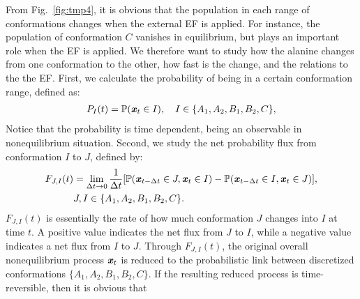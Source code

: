 \documentclass[a4paper,preprint,unsortedaddress,onecolumn]{revtex4-1}
\newcommand{\vect}[1]{\textbf{\textit{#1}}}
\newcommand{\fwd}[0]{\textrm{fwd}}
\newcommand{\bwd}[0]{\textrm{bwd}}
\begin{document}
From Fig.~\ref{fig:tmp4}, it is obvious that the population in each
range of conformations changes when the external EF is applied.
For instance, the population of conformation $C$ vanishes in equilibrium,
but plays an important role when the EF is applied. We
therefore want to study how the alanine changes from one conformation
to the other, how fast is the change, and the relations to the 
the EF. 
First, we calculate the probability of being in a certain conformation range,
defined as:
\begin{align}
  P_I(t) = \mathbb P (\vect x_t \in I), \quad  I \in \{A_1, A_2, B_1, B_2, C\},
\end{align}
Notice that the probability is time dependent, being an observable in nonequilibrium situation.
Second,
we study the net probability flux from conformation $I$ to $J$, defined by:
\begin{align}\nonumber
  F_{J,I}(t) & =\lim_{\Delta t\rightarrow 0} \frac1{\Delta t} [\mathbb P( \vect x_{t-\Delta t} \in J, \vect x_t \in I) - \mathbb P( \vect x_{t-\Delta t} \in I, \vect x_t \in J)], \\\label{eqn:tmp7}
  & J,I \in \{A_1, A_2, B_1, B_2, C\}.
\end{align}
$F_{J,I}(t)$ is essentially the rate of how much conformation $J$ changes
into $I$ at time $t$. A positive value indicates the
net flux from $J$ to $I$,
while a negative value indicates a net flux from $I$ to $J$.
Through $F_{J,I}(t)$, the original overall nonequilibrium process $\vect x_t$
is reduced to the probabilistic link between discretized conformations $\{A_1, A_2, B_1, B_2, C\}$.
If the resulting reduced process 
is time-reversible, then it is obvious that
\end{document}
